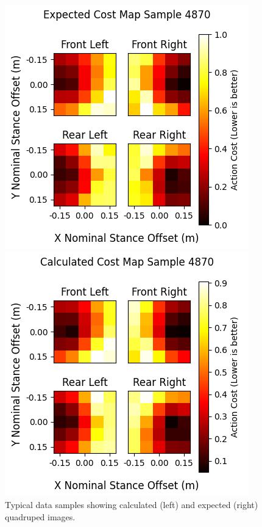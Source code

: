 \begin{figure}[H]
  \centering
  \begin{minipage}[T]{0.45\textwidth}
    \centering
    \includegraphics[width=\textwidth]{images/data/training/typical-expected.png}
  \end{minipage}
  \hfill
  \begin{minipage}[T]{0.45\textwidth}
    \centering
    \includegraphics[width=\textwidth]{images/data/training/typical-calculated.png}
  \end{minipage}
  \hfill

  \caption{Typical data samples showing calculated (left) and
  expected (right) quadruped images.}
  \label{fig:data-cn-typical-comparison}
\end{figure}

